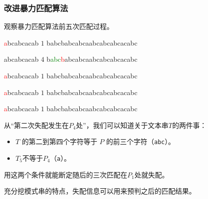 \documentclass{ctexbeamer}
\newcommand{\red}[1]{\textcolor{red}{#1}}
\newcommand{\green}[1]{\textcolor{green}{#1}}
\newcommand{\str}[1]{\texttt{#1}}
\begin{document}
\begin{frame}[fragile]
\frametitle{改进暴力匹配算法}

观察暴力匹配算法前五次匹配过程。

	\begin{tverb}
\red{a}bcabcacab \(1\)
babcbabcabcaabcabcabcacabc
	\end{tverb}

\begin{tverb}
 abcabcacab \(4\)
b\green{abc}\red{b}abcabcaabcabcabcacabc
	\end{tverb}


	\begin{tverb}
  \red{a}bcabcacab \(1\)
babcbabcabcaabcabcabcacabc
	\end{tverb}

	\begin{tverb}
   \red{a}bcabcacab \(1\)
babcbabcabcaabcabcabcacabc
	\end{tverb}

	\begin{tverb}
    \red{a}bcabcacab \(1\)
babcbabcabcaabcabcabcacabc
	\end{tverb}

从``第二次失配发生在$P_4$处''，我们可以知道关于文本串$T$的两件事：
\begin{itemize}
\item $T$ 的第二到第四个字符等于 $P$ 的前三个字符（\str{abc}）。
\item $T_5$不等于$P_4$（\str{a}）。
\end{itemize}
用这两个条件就能断定随后的三次匹配在$P_1$处就失配。

充分挖模式串的特点，失配信息可以用来预判之后的匹配结果。

\end{frame}
\end{document}
